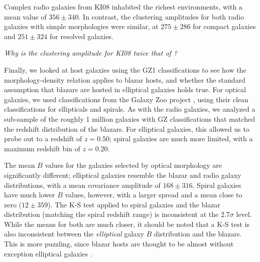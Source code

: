 \documentclass{emulateapj}
\begin{document}
Complex radio galaxies from KI08 inhabited the richest environments, with a mean \bgb{} value of $356\pm340$. In contrast, the clustering amplitudes for both radio galaxies with simple morphologies were similar, at $275\pm286$ for compact galaxies and $251\pm324$ for resolved galaxies. 

{\em Why is the clustering amplitude for KI08 twice that of \config?}

Finally, we looked at host galaxies using the GZ1 classifications to see how the morphology-density relation applies to blazar hosts, and whether the standard assumption that blazars are hosted in elliptical galaxies holds true. For optical galaxies, we used classifications from the Galaxy Zoo project \citep[GZ;][]{lin11}, using their clean classifications for ellipticals and spirals. As with the radio galaxies, we analyzed a sub-sample of the roughly 1 million galaxies with GZ classifications that matched the redshift distribution of the blazars. For elliptical galaxies, this allowed us to probe out to a redshift of $z=0.50$; spiral galaxies are much more limited, with a maximum redshift bin of $z=0.20$. 

The mean $B$ values for the galaxies selected by optical morphology are significantly different; elliptical galaxies resemble the blazar and radio galaxy distributions, with a mean covariance amplitude of $168\pm316$. Spiral galaxies have much lower $B$ values, however, with a larger spread and a mean close to zero ($12\pm359$). The K-S test applied to spiral galaxies and the blazar distribution (matching the spiral redshift range) is inconsistent at the 2.7$\sigma$ level. While the means for both are much closer, it should be noted that a K-S test is also inconsistent between the {\em elliptical} galaxy $B$ distribution and the blazars. This is more puzzling, since blazar hosts are thought to be almost without exception elliptical galaxies \citep{urr95}. 
\end{document}
